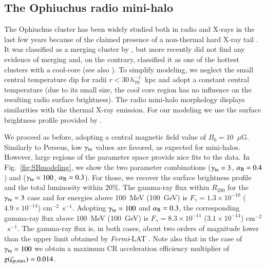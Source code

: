 \documentclass[useAMS,usenatbib]{mn2e}
\begin{document}
\subsection{The Ophiuchus radio mini-halo}

The Ophiuchus cluster has been widely studied both in radio and X-rays in the
last few years because of the claimed presence of a non-thermal hard X-ray tail
\citep{2008A&A...479...27E,2008PASJ...60.1133F,2009A&A...499..371G,
  2009A&A...499..679M,2009MNRAS.396.2237P,2009A&A...508.1161N,2010A&A...514A..76M,
  2010MNRAS.405.1624M}.  It was classified as a merging cluster by
\cite{2001PASJ...53..605W}, but more recently \cite{2008PASJ...60.1133F} did not
find any evidence of merging and, on the contrary, classified it as one of the
hottest clusters with a cool-core (see also \citealp{2010MNRAS.405.1624M}).  To
simplify modeling, we neglect the small central temperature dip for radii
$r<30\,h_{70}^{-1}$~kpc and adopt a constant central temperature (due to its
small size, the cool core region has no influence on the resulting radio surface
brightness).  The radio mini-halo morphology displays similarities with the
thermal X-ray emission. For our modeling we use the surface brightness profile
provided by \cite{2009A&A...499..679M}.

We proceed as before, adopting a central magnetic field value of
$B_{0}=10$~$\mu$G. Similarly to Perseus, low $\gamma_{{\mathrm{tu}}}$ values are
favored, as expected for mini-halos. However, large regions of the parameter
space provide nice fits to the data.  In Fig.~\ref{fig:SBmodeling}, we show the
two parameter combinations ($\gamma_{{\mathrm{tu}}}=3$, $ \alpha_{{\mathrm{B}}}=0.4$) and
($\gamma_{{\mathrm{tu}}}=100$, $ \alpha_{{\mathrm{B}}}=0.3$).  For those, we recover the surface
brightness profile and the total luminosity within $20\%$. The gamma-ray flux
within $R_{200}$ for the $\gamma_{{\mathrm{tu}}}=3$ case and for energies above
100~MeV (100~GeV) is $F_{\gamma} = 1.3 \times 10^{-10}$ ($4.9 \times 10^{-14}$)
cm$^{-2}$~s$^{-1}$. Adopting $\gamma_{{\mathrm{tu}}}=100$ and $ \alpha_{{\mathrm{B}}}=0.3$, the
corresponding gamma-ray flux above 100~MeV (100~GeV) is $F_{\gamma} = 8.3 \times
10^{-11}$ ($3.1 \times 10^{-14}$) cm$^{-2}$~s$^{-1}$. The gamma-ray flux is, in
both cases, about two orders of magnitude lower than the upper limit obtained by
\emph{Fermi}-LAT \citep{2010ApJ...717L..71A}. Note also that in the case of
$\gamma_{{\mathrm{tu}}} = 100$ we obtain a maximum CR acceleration efficiency
multiplier of $g(\zeta_{{\mathrm{p,max}}})=0.014$.


\end{document}
